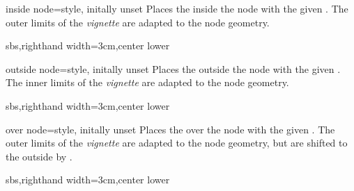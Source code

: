 \enlargethispage*{1cm}

\begin{vigTcbKey}[][doc new=2016-04-22]{inside node}{=}{style, initally unset}
  Places the  inside the node with the given .
  The outer limits of the \emph{vignette} are adapted to the node geometry.
\begin{dispExample*}{sbs,righthand width=3cm,center lower}
\end{dispExample*}
\end{vigTcbKey}

\clearpage

\begin{vigTcbKey}[][doc new=2016-04-22]{outside node}{=}{style, initally unset}
  Places the  outside the node with the given .
  The inner limits of the \emph{vignette} are adapted to the node geometry.
\begin{dispExample*}{sbs,righthand width=3cm,center lower}
\end{dispExample*}
\end{vigTcbKey}


\begin{vigTcbKey}[][doc new=2016-04-22]{over node}{=}{style, initally unset}
  Places the  over the node with the given .
  The outer limits of the \emph{vignette} are adapted to the node geometry, but
  are shifted to the outside by .
\begin{dispExample*}{sbs,righthand width=3cm,center lower}
\end{dispExample*}
\end{vigTcbKey}

